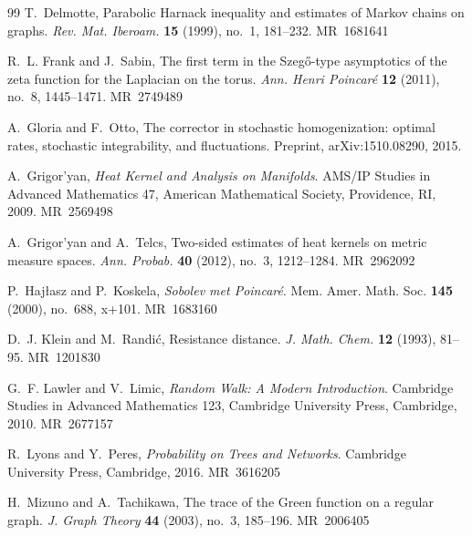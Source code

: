 \documentclass[reqno]{amsart}
\providecommand{\MR}[1]{\textsc{MR}~#1}
\numberwithin{equation}{section}
\theoremstyle{definition}
\theoremstyle{remark}
\begin{document}
\begin{thebibliography}{99}
T.~Delmotte, Parabolic Harnack inequality and estimates of Markov chains on graphs.
\emph{Rev. Mat. Iberoam.} \textbf{15} (1999), no.~1, 181--232.
\MR{1681641}

R.~L. Frank and J.~Sabin, The first term in the Szeg\H{o}-type asymptotics of the zeta function for the Laplacian on the torus.
\emph{Ann. Henri Poincar\'e} \textbf{12} (2011), no.~8, 1445--1471.
\MR{2749489}

A.~Gloria and F.~Otto, The corrector in stochastic homogenization: optimal rates, stochastic integrability, and fluctuations.
Preprint, arXiv:1510.08290, 2015.

A.~Grigor'yan, \emph{Heat Kernel and Analysis on Manifolds}.
AMS/IP Studies in Advanced Mathematics 47, American Mathematical Society, Providence, RI, 2009.
\MR{2569498}

A.~Grigor'yan and A.~Telcs, Two-sided estimates of heat kernels on metric measure spaces.
\emph{Ann. Probab.} \textbf{40} (2012), no.~3, 1212--1284.
\MR{2962092}

P.~Hajłasz and P.~Koskela, \emph{Sobolev met Poincaré}.
Mem. Amer. Math. Soc. \textbf{145} (2000), no.~688, x+101.
\MR{1683160}

D.~J. Klein and M.~Randi{\'c}, Resistance distance.
\emph{J. Math. Chem.} \textbf{12} (1993), 81--95.
\MR{1201830}

G.~F. Lawler and V.~Limic, \emph{Random Walk: A Modern Introduction}.
Cambridge Studies in Advanced Mathematics 123, Cambridge University Press, Cambridge, 2010.
\MR{2677157}

R.~Lyons and Y.~Peres, \emph{Probability on Trees and Networks}.
Cambridge University Press, Cambridge, 2016.
\MR{3616205}

H.~Mizuno and A.~Tachikawa, The trace of the Green function on a regular graph.
\emph{J. Graph Theory} \textbf{44} (2003), no.~3, 185--196.
\MR{2006405}

\end{thebibliography}
\end{document}
